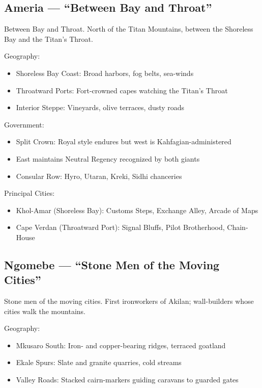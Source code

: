 \subsection{Ameria --- ``Between Bay and Throat''}
\label{sec:ameria}

Between Bay and Throat. North of the Titan Mountains, between the Shoreless Bay and the Titan's Throat.

Geography:
\begin{itemize}
    \item Shoreless Bay Coast: Broad harbors, fog belts, sea-winds
    \item Throatward Ports: Fort-crowned capes watching the Titan's Throat
    \item Interior Steppe: Vineyards, olive terraces, dusty roads
\end{itemize}

Government:
\begin{itemize}
    \item Split Crown: Royal style endures but west is Kahfagian-administered
    \item East maintains Neutral Regency recognized by both giants
    \item Consular Row: Hyro, Utaran, Kreki, Sidhi chanceries
\end{itemize}

Principal Cities:
\begin{itemize}
    \item Khol-Amar (Shoreless Bay): Customs Steps, Exchange Alley, Arcade of Maps
    \item Cape Verdan (Throatward Port): Signal Bluffs, Pilot Brotherhood, Chain-House
\end{itemize}

\subsection{Ngomebe --- ``Stone Men of the Moving Cities''}
\label{sec:ngomebe}

Stone men of the moving cities. First ironworkers of Akilan; wall-builders whose cities walk the mountains.

Geography:
\begin{itemize}
    \item Mkusaro South: Iron- and copper-bearing ridges, terraced goatland
    \item Ekale Spurs: Slate and granite quarries, cold streams
    \item Valley Roads: Stacked cairn-markers guiding caravans to guarded gates
\end{itemize}

